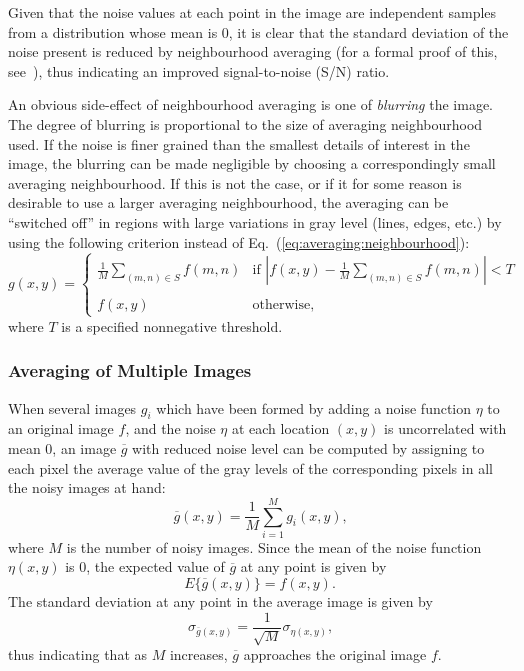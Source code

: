 Given that the noise values at each point in the image are independent
samples from a distribution whose mean is 0, it is clear that the
standard deviation of the noise present is reduced by neighbourhood
averaging (for a formal proof of this, see~\cite{digpic}), thus
indicating an improved signal-to-noise (S/N) ratio.

An obvious side-effect of neighbourhood averaging is one of {\em
  blurring\/} the image.  The degree of blurring is proportional to
the size of averaging neighbourhood used.  If the noise is finer
grained than the smallest details of interest in the image, the
blurring can be made negligible by choosing a correspondingly small
averaging neighbourhood.  If this is not the case, or if it for some
reason is desirable to use a larger averaging neighbourhood, the
averaging can be ``switched off'' in regions with large variations in
gray level (lines, edges, etc.) by using the following criterion
instead of Eq.~(\ref{eq:averaging:neighbourhood}):
\begin{equation}
  g(x,y)=\left\{
    \begin{array}{ll}
      \frac{1}{M}\sum_{(m,n)\in S}f(m,n) &
        \mbox{if $\left|f(x,y)-\frac{1}{M}\sum_{(m,n)\in
            S}f(m,n)\right|<T$} \\
             & \\
      f(x,y) & \mbox{otherwise,}
    \end{array}\right.
\end{equation}
where $T$ is a specified nonnegative threshold.

\subsubsection{Averaging of Multiple Images}

When several images $g_{i}$ which have been formed by adding a noise
function $\eta$ to an original image $f$, and the noise $\eta$ at each
location $(x,y)$ is uncorrelated with mean 0, an image $\overline{g}$
with reduced noise level can be computed by assigning to each pixel
the average value of the gray levels of the corresponding pixels in
all the noisy images at hand:
\begin{equation}
  \overline{g}(x,y)=\frac{1}{M}\sum_{i=1}^{M}g_{i}(x,y)\mbox{,}
\end{equation}
where $M$ is the number of noisy images.  Since the mean of the noise
function $\eta(x,y)$ is 0, the expected value of $\overline{g}$ at any
point is given by
\begin{equation}
  E\{\overline{g}(x,y)\}=f(x,y)\mbox{.}
\end{equation}
The standard deviation at any point in the average image is given by
\begin{equation}
  \sigma_{\overline{g}(x,y)}=\frac{1}{\sqrt{M}}\sigma_{\eta(x,y)}\mbox{,}
\end{equation}
thus indicating that as $M$ increases, $\overline{g}$ approaches the
original image $f$.


